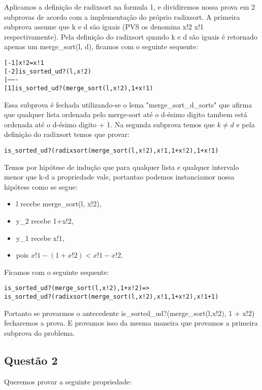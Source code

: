 \documentclass[a4paper, 12pt]{article}
\begin{document}
Aplicamos a definição de radixsort na formula 1, e dividiremos nossa prova em 2 subprovas de acordo com a implementação do próprio radixsort.
A primeira subprova assume que k e d são iguais (PVS os denomina x!2 x!1 respectivamente).
Pela definição do radixsort quando k e d são iguais é retornado apenas um merge\_sort(l, d), ficamos com o seguinte sequente:


\begin{alltt}
 [-1]  x!2 = x!1
 [-2]  is_sorted_ud?(l, x!2)
  |-------
 [1]   is_sorted_ud?(merge_sort(l, x!2), 1 + x!1)
\end{alltt}


Essa subprova é fechada utilizando-se o lema "merge\_sort\_d\_sorts" que afirma que qualquer lista ordenada pelo merge-sort até o d-ésimo digito tambem está ordenada até o d-ésimo digito + 1.
Na segunda subprova temos que $k \neq d$ e pela definição do radixsort temos que provar:


\begin{alltt}
 is_sorted_ud?(radixsort(merge_sort(l, x!2), x!1, 1 + x!2), 1 + x!1)
\end{alltt}


Temos por hipótese de indução que para qualquer lista e qualquer intervalo menor que k-d a propriedade vale, portantao podemos instanciamor nossa hipótese como se segue: \\
\begin{itemize}
\item l recebe merge\_sort(l, x!2),\\
\item y\_2 recebe 1+x!2,\\
\item y\_1 recebe x!1,\\
\item pois $x!1 - (1+x!2) < x!1 - x!2$.
\end{itemize}
 
 
Ficamos com o seguinte sequente:

\begin{alltt}
 is_sorted_ud?(merge_sort(l, x!2), 1 + x!2) =>
        is_sorted_ud?(radixsort(merge_sort(l, x!2), x!1, 1 + x!2), x!1 + 1)
\end{alltt}


Portanto se provarmos o antecedente is\_sorted\_ud?(merge\_sort(l,x!2), 1 + x!2) fecharemos a prova. E provamos isso da mesma maneira que provamos a primeira subprova do problema.  

\subsection{Questão 2}
Queremos provar a seguinte propriedade:
\end{document}
